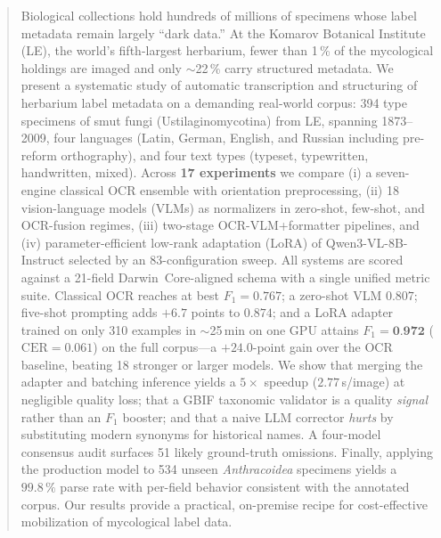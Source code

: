 \begin{abstract}
Biological collections hold hundreds of millions of specimens whose label
metadata remain largely ``dark data.'' At the Komarov Botanical Institute
(LE), the world's fifth-largest herbarium, fewer than 1\,\% of the mycological
holdings are imaged and only $\sim$22\,\% carry structured metadata. We present
a systematic study of automatic transcription and structuring of herbarium
label metadata on a demanding real-world corpus: 394 type specimens of smut
fungi (Ustilaginomycotina) from LE, spanning 1873--2009, four languages
(Latin, German, English, and Russian including pre-reform orthography), and
four text types (typeset, typewritten, handwritten, mixed). Across
\textbf{17 experiments} we compare (i) a seven-engine classical OCR ensemble
with orientation preprocessing, (ii) 18 vision-language models (VLMs) as
normalizers in zero-shot, few-shot, and OCR-fusion regimes, (iii) two-stage
OCR-VLM+formatter pipelines, and (iv) parameter-efficient low-rank adaptation
(LoRA) of Qwen3-VL-8B-Instruct selected by an 83-configuration sweep. All
systems are scored against a 21-field Darwin~Core-aligned schema with a single
unified metric suite. Classical OCR reaches at best $F_1=0.767$; a zero-shot
VLM $0.807$; five-shot prompting adds $+6.7$ points to $0.874$; and a LoRA
adapter trained on only 310 examples in $\sim$25\,min on one GPU attains
$F_1=\textbf{0.972}$ ($\mathrm{CER}=0.061$) on the full corpus---a $+24.0$-point
gain over the OCR baseline, beating 18 stronger or larger models. We show that
merging the adapter and batching inference yields a $5\times$ speedup
($2.77$\,s/image) at negligible quality loss; that a GBIF taxonomic validator
is a quality \emph{signal} rather than an $F_1$ booster; and that a naive LLM
corrector \emph{hurts} by substituting modern synonyms for historical names.
A four-model consensus audit surfaces 51 likely ground-truth omissions.
Finally, applying the production model to 534 unseen \emph{Anthracoidea}
specimens yields a $99.8\,\%$ parse rate with per-field behavior consistent
with the annotated corpus. Our results provide a practical, on-premise recipe
for cost-effective mobilization of mycological label data.
\end{abstract}
